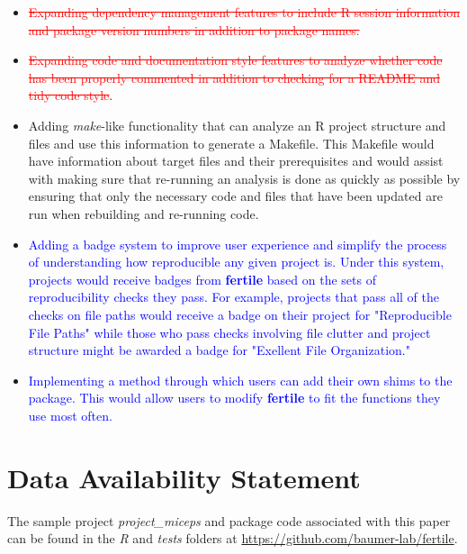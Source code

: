 \documentclass[APA,LATO1COL]{WileyNJD-v2}\usepackage[]{graphicx}\usepackage[]{color}
\newcommand{\R}{\textsf{R}\xspace}
\newcommand{\cmd}[1]{\textit{#1}}
\newcommand{\pkg}[1]{\textbf{#1}}
\begin{document}
\begin{itemize} [noitemsep]
  \item \textcolor{red}{\st{Expanding dependency management features to include R session information and package version numbers in addition to package names.}}
  \item \textcolor{red}{\st{Expanding code and documentation style features to analyze whether code has been properly commented in addition to checking for a README and tidy code style}}.
  \item Adding \cmd{make}-like functionality that can analyze an \R project structure and files and use this information to generate a Makefile. This Makefile would have information about target files and their prerequisites and would assist with making sure that re-running an analysis is done as quickly as possible by ensuring that only the necessary code and files that have been updated are run when rebuilding and re-running code.
  \item \textcolor{blue}{Adding a badge system to improve user experience and simplify the process of understanding how reproducible any given project is. Under this system, projects would receive badges from \pkg{fertile} based on the sets of reproducibility checks they pass. For example, projects that pass all of the checks on file paths would receive a badge on their project for "Reproducible File Paths" while those who pass checks involving file clutter and project structure might be awarded a badge for "Exellent File Organization."}
  \item \textcolor{blue}{Implementing a method through which users can add their own shims to the package. This would allow users to modify \pkg{fertile} to fit the functions they use most often. }
\end{itemize}


\section*{Data Availability Statement}
The sample project \cmd{project\_miceps} and package code associated with this paper can be found in the \cmd{R} and \cmd{tests} folders at \url{https://github.com/baumer-lab/fertile}.

\nocite{*}%
\end{document}
